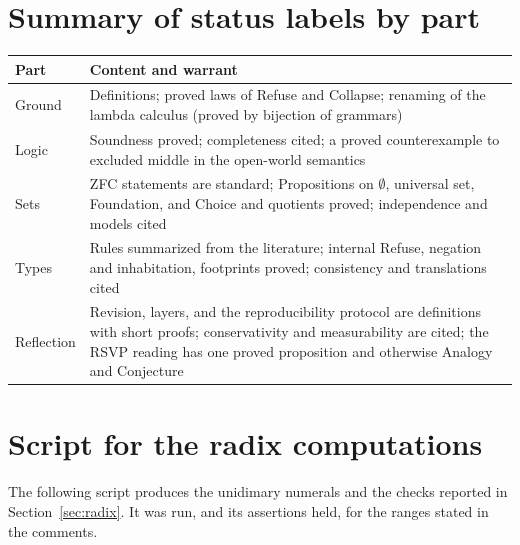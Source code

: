 \documentclass[11pt]{article}
\theoremstyle{definition}
\theoremstyle{plain}
\theoremstyle{remark}
\begin{document}
\section{Summary of status labels by part}\label{app:status}

\begin{center}
\small
\begin{tabular}{@{}lp{}@{}}
\toprule
Part & Content and warrant\\
\midrule
Ground & Definitions; proved laws of Refuse and Collapse; renaming of the lambda calculus (proved by bijection of grammars)\\
Logic & Soundness proved; completeness cited; a proved counterexample to excluded middle in the open-world semantics\\
Sets & ZFC statements are standard; Propositions on $\emptyset$, universal set, Foundation, and Choice and quotients proved; independence and models cited\\
Types & Rules summarized from the literature; internal Refuse, negation and inhabitation, footprints proved; consistency and translations cited\\
Reflection & Revision, layers, and the reproducibility protocol are definitions with short proofs; conservativity and measurability are cited; the RSVP reading has one proved proposition and otherwise Analogy and Conjecture\\
\bottomrule
\end{tabular}
\end{center}


\section{Script for the radix computations}\label{app:script}

The following script produces the unidimary numerals and the checks reported in Section~\ref{sec:radix}. It was run, and its assertions held, for the ranges stated in the comments.
\end{document}
